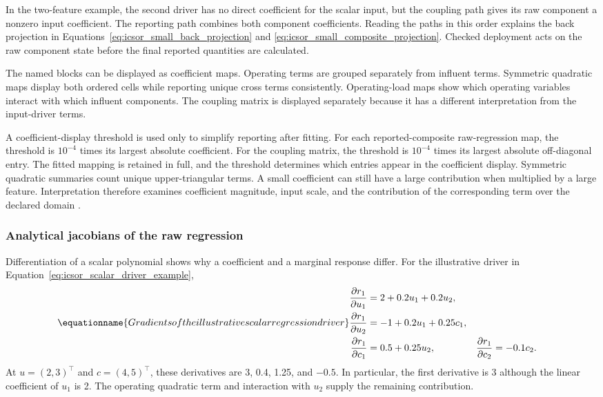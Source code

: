 In the two-feature example, the second driver has no direct coefficient for the scalar input, but the coupling path gives its raw component a nonzero input coefficient. The reporting path combines both component coefficients. Reading the paths in this order explains the back projection in Equations~\eqref{eq:icsor_small_back_projection} and \eqref{eq:icsor_small_composite_projection}. Checked deployment acts on the raw component state before the final reported quantities are calculated.

The named blocks can be displayed as coefficient maps. Operating terms are grouped separately from influent terms. Symmetric quadratic maps display both ordered cells while reporting unique cross terms consistently. Operating-load maps show which operating variables interact with which influent components. The coupling matrix is displayed separately because it has a different interpretation from the input-driver terms.

A coefficient-display threshold is used only to simplify reporting after fitting. For each reported-composite raw-regression map, the threshold is \(10^{-4}\) times its largest absolute coefficient. For the coupling matrix, the threshold is \(10^{-4}\) times its largest absolute off-diagonal entry. The fitted mapping is retained in full, and the threshold determines which entries appear in the coefficient display. Symmetric quadratic summaries count unique upper-triangular terms. A small coefficient can still have a large contribution when multiplied by a large feature. Interpretation therefore examines coefficient magnitude, input scale, and the contribution of the corresponding term over the declared domain \citep{Selerio2026,Nazlabadi2021}.

\subsubsection{Analytical jacobians of the raw regression}

Differentiation of a scalar polynomial shows why a coefficient and a marginal response differ. For the illustrative driver in Equation~\eqref{eq:icsor_scalar_driver_example},
\begin{equation}
\equationname{Gradients of the illustrative scalar regression driver}
\label{eq:icsor_scalar_driver_derivatives}
\begin{aligned}
\frac{\partial r_1}{\partial u_1}&=2+0.2u_1+0.2u_2,\\
\frac{\partial r_1}{\partial u_2}&=-1+0.2u_1+0.25c_1,\\
\frac{\partial r_1}{\partial c_1}&=0.5+0.25u_2,
&\frac{\partial r_1}{\partial c_2}&=-0.1c_2.
\end{aligned}
\end{equation}
At \(u=(2,3)^\top\) and \(c=(4,5)^\top\), these derivatives are 3, 0.4, 1.25, and \(-0.5\). In particular, the first derivative is 3 although the linear coefficient of \(u_1\) is 2. The operating quadratic term and interaction with \(u_2\) supply the remaining contribution.

